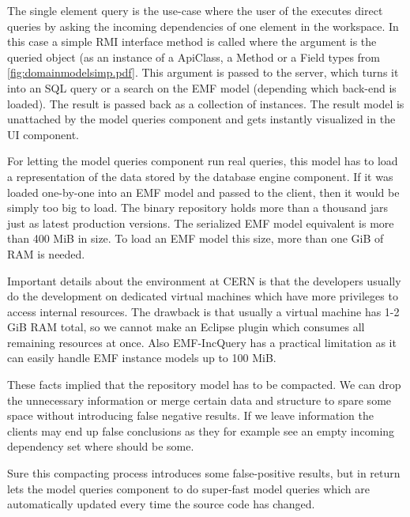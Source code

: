 The single element query is the use-case where the user of the \ptool  executes
direct queries by asking the incoming dependencies of one element in
the workspace. In this case a simple RMI interface method is called where the
argument is the queried object (as an instance of a ApiClass, a Method or a
Field types from \autoref{fig:domainmodelsimp.pdf}. This argument is passed to
the server, which turns it into an SQL query or a search on the EMF model
(depending which back-end is loaded). The result is passed back as a collection
of  instances. The result model is unattached by the model
queries component and gets instantly visualized in the UI component.

For letting the model queries component run real queries, this model has to load
a representation of the data stored by the database engine component. If it was
loaded one-by-one into an EMF model and passed to the client, then it would be
simply too big to load. The binary repository holds more than a thousand jars
just as latest production versions. The serialized EMF model equivalent is more
than 400 MiB in size. To load an EMF model this size, more than one GiB  of
RAM is needed.

Important details about the environment at CERN is that the developers usually
do the development on dedicated virtual machines which have more privileges to
access internal resources. The drawback is that usually a virtual machine has
1-2 GiB RAM total, so we cannot make an Eclipse plugin which consumes all
remaining resources at once. Also EMF-IncQuery has a practical limitation as it
can easily handle EMF instance models up to 100 MiB.

These facts implied that the repository model has to be compacted. We can drop
the unnecessary information or merge certain data and structure to spare some
space without introducing false negative results. If we leave information the
clients may end up false conclusions as they for example see an empty incoming
dependency set where should be some. 

Sure this compacting process introduces some false-positive results, but in 
return lets the model queries component to do super-fast model queries which
are automatically updated every time the source code has changed. 

